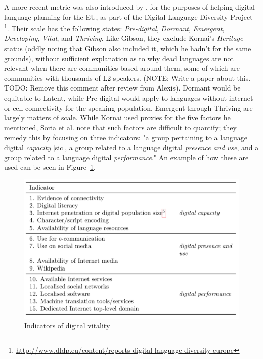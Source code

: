 A more recent metric was also introduced by \citet{soria2017digital}, for the purposes of helping digital language planning for the EU, as part of the Digital Language Diversity Project \footnote{\href{http://www.dldp.eu/content/reports-digital-language-diversity-europe}{http://www.dldp.eu/content/reports-digital-language-diversity-europe}}. Their scale has the following states: {\it Pre-digital}, {\it Dormant}, {\it Emergent}, {\it Developing}, {\it Vital}, and {\it Thriving}. Like Gibson, they exclude Kornai's {\it Heritage} status (oddly noting that Gibson also included it, which he hadn't for the same grounds), without sufficient explanation as to why dead languages are not relevant when there are communities based around them, some of which are communities with thousands of L2 speakers. (NOTE: Write a paper about this. TODO: Remove this comment after review from Alexis). Dormant would be equitable to Latent, while Pre-digital would apply to languages without internet or cell connectivity for the speaking population. Emergent through Thriving are largely matters of scale. While Kornai used proxies for the five factors he mentioned, Soria et al. note that such factors are difficult to quantify; they remedy this by focusing on three indicators: "a group pertaining to a language digital {\it capacity} [sic], a group related to a language digital {\it presence and use}, and a group related to a language digital {\it performance}." \citep[5]{soria2017digital} An example of how these are used can be seen in Figure~\ref{fig:dldp}.

\begin{figure}
 \centering
 \includegraphics[width=.8\textwidth]{img/dldp.png}
 \caption{Indicators of digital vitality \citep[6]{soria2017digital}}
 \label{fig:dldp}
\end{figure}


